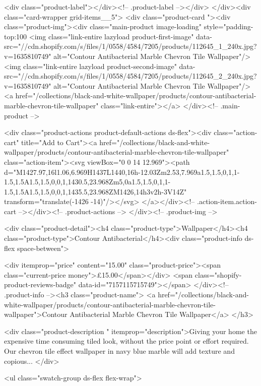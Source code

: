 {{{{{{{<div class="product-label"></div><!-- .product-label --></div>
          </div><div class="card-wrapper grid-items__5">
            <div class="product-card "><div class="product-img"><div class="main-product image-loading" style="padding-top:100%
      <img class="link-entire lazyload product-first-image" data-src="//cdn.shopify.com/s/files/1/0558/4584/7205/products/112645_1_240x.jpg?v=1635810749" alt="Contour Antibacterial Marble Chevron Tile Wallpaper"/><img class="link-entire lazyload product-second-image" data-src="//cdn.shopify.com/s/files/1/0558/4584/7205/products/112645_2_240x.jpg?v=1635810749" alt="Contour Antibacterial Marble Chevron Tile Wallpaper"/>
      <a href="/collections/black-and-white-wallpaper/products/contour-antibacterial-marble-chevron-tile-wallpaper" class="link-entire"></a>
    </div><!-- .main-product -->
  
<div class="product-actions product-default-actions ds-flex"><div class="action-cart" title="Add to Cart"><a href="/collections/black-and-white-wallpaper/products/contour-antibacterial-marble-chevron-tile-wallpaper" class="action-item"><svg viewBox="0 0 14 12.969"><path d="M1427.97,16l1.06,6.969H1437L1440,16h-12.03Zm2.53,7.969a1.5,1.5,0,1,1-1.5,1.5A1.5,1.5,0,0,1,1430.5,23.968Zm5,0a1.5,1.5,0,1,1-1.5,1.5A1.5,1.5,0,0,1,1435.5,23.968ZM1426,14h3v2h-3V14Z" transform="translate(-1426 -14)"/></svg>
</a></div><!-- .action-item.action-cart --></div><!-- .product-actions -->
</div><!-- .product-img -->

<div class="product-detail"><h4 class="product-type">Wallpaper</h4><h4 class="product-type">Contour Antibacterial</h4><div class="product-info ds-flex space-between">
    
<div itemprop="price" content="15.00" class="product-price"><span class="current-price money">£15.00</span></div>
    <span class="shopify-product-reviews-badge" data-id="7157115715749"></span>
  </div><!-- .product-info --><h3 class="product-name">
      <a href="/collections/black-and-white-wallpaper/products/contour-antibacterial-marble-chevron-tile-wallpaper">Contour Antibacterial Marble Chevron Tile Wallpaper</a>
    </h3>
    
<div class="product-description " itemprop="description">Giving your home the expensive time consuming tiled look, without the price point or effort required. Our chevron tile effect wallpaper in navy blue marble will add texture and copious...
</div>



<ul class="swatch-group ds-flex flex-wrap">
        
}}}}}}}
